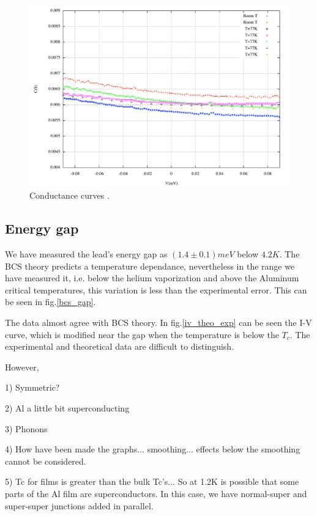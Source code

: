 \begin{figure}
\centering
\includegraphics[scale=0.6]{conductance}
\caption{\small Conductance curves . \label{conductance}}
\end{figure}



\subsection{Energy gap}
We have measured the lead's energy gap as $(1.4 \pm 0.1)meV$ below $4.2K$. The BCS theory predicts a temperature dependance, nevertheless in the range we have measured it, i.e. below the helium vaporization and above the Aluminum critical temperatures, this variation is less than the experimental error. This can be seen in fig.\ref{bcs_gap}.

The data almost agree with BCS theory. In fig.\ref{iv_theo_exp} can be seen the I-V curve, which is modified near the gap when the temperature is below the $T_c$. The experimental and theoretical data are difficult to distinguish. 

However, 



1) Symmetric?

2) Al a little bit superconducting

3) Phonons

4)  How have been made the graphs... smoothing... effects below the smoothing cannot be considered.

5) Tc for films is greater than the bulk Tc's... So at 1.2K is possible that some parts of the Al film are superconductors. In this case, we have normal-super and super-super junctions added in parallel.



